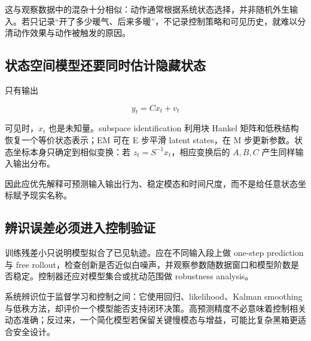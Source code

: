 这与观察数据中的混杂十分相似：动作通常根据系统状态选择，并非随机外生输入。若只记录``开了多少暖气、后来多暖''，不记录控制策略和可见历史，就难以分清动作效果与动作被触发的原因。

\subsection{状态空间模型还要同时估计隐藏状态}

只有输出

\[
y_t=Cx_t+v_t
\]

可见时，\(x_t\) 也是未知量。subspace identification 利用块 Hankel 矩阵和低秩结构恢复一个等价状态表示；EM 可在 E 步平滑 latent states，在 M 步更新参数。状态坐标本身只确定到相似变换：若 \(z_t=S^{-1}x_t\)，相应变换后的 \(A,B,C\) 产生同样输入输出分布。

因此应优先解释可预测输入输出行为、稳定模态和时间尺度，而不是给任意状态坐标赋予现实名称。

\subsection{辨识误差必须进入控制验证}

训练残差小只说明模型拟合了已见轨迹。应在不同输入段上做 one-step prediction 与 free rollout，检查创新是否近似白噪声，并观察参数随数据窗口和模型阶数是否稳定。控制器还应对模型集合或扰动范围做 robustness analysis。

系统辨识位于监督学习和控制之间：它使用回归、likelihood、Kalman smoothing 与低秩方法，却评价一个模型能否支持闭环决策。高预测精度不必意味着控制相关动态准确；反过来，一个简化模型若保留关键慢模态与增益，可能比复杂黑箱更适合安全设计。
